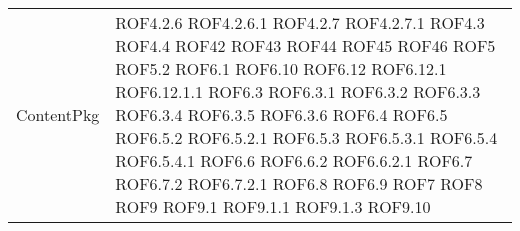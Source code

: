 \begin{longtable}{p{5cm}!{\VRule[1pt]}p{2.5cm}}
		ContentPkg & ROF4.2.6 \newline ROF4.2.6.1 \newline ROF4.2.7 \newline ROF4.2.7.1 \newline ROF4.3 \newline ROF4.4 \newline ROF42 \newline ROF43 \newline ROF44 \newline ROF45 \newline ROF46 \newline ROF5 \newline ROF5.2 \newline ROF6.1 \newline ROF6.10 \newline ROF6.12 \newline ROF6.12.1 \newline ROF6.12.1.1 \newline ROF6.3 \newline ROF6.3.1 \newline ROF6.3.2 \newline ROF6.3.3 \newline ROF6.3.4 \newline ROF6.3.5 \newline ROF6.3.6 \newline ROF6.4 \newline ROF6.5 \newline ROF6.5.2 \newline ROF6.5.2.1 \newline ROF6.5.3 \newline ROF6.5.3.1 \newline ROF6.5.4 \newline ROF6.5.4.1 \newline ROF6.6 \newline ROF6.6.2 \newline ROF6.6.2.1 \newline ROF6.7 \newline ROF6.7.2 \newline ROF6.7.2.1 \newline ROF6.8 \newline ROF6.9 \newline ROF7 \newline ROF8 \newline ROF9 \newline ROF9.1 \newline ROF9.1.1 \newline ROF9.1.3 \newline ROF9.10 \\

\end{longtable}
